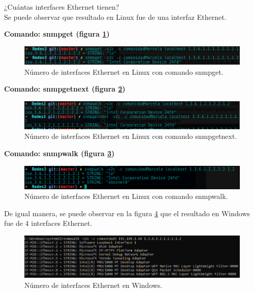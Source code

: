 \item ¿Cuántas interfaces Ethernet tienen?
\\ Se puede observar que resultado en Linux fue de una interfaz Ethernet.

\textbf{Comando: snmpget (figura \ref{image:ethernetget})}
\FloatBarrier
\begin{figure}[htbp!]
		\centering
	\includegraphics[width=.9 \textwidth]{images/ethernetget}
		\caption{Número de interfaces Ethernet en Linux con comando snmpget.}		\label{image:ethernetget}
\end{figure}
\FloatBarrier

\textbf{Comando: snmpgetnext (figura \ref{image:ethernetnext})}
\FloatBarrier
\begin{figure}[htbp!]
		\centering
	\includegraphics[width=.9 \textwidth]{images/ethernetnext}
		\caption{Número de interfaces Ethernet en Linux con comando snmpgetnext.}		\label{image:ethernetnext}
\end{figure}
\FloatBarrier

\textbf{Comando: snmpwalk (figura \ref{image:interfaces})}
\FloatBarrier
\begin{figure}[htbp!]
		\centering
	\includegraphics[width=.9 \textwidth]{images/Pregunta2L}
		\caption{Número de interfaces Ethernet en Linux con comando snmpwalk.}		\label{image:interfaces}
\end{figure}
\FloatBarrier

De igual manera, se puede observar en la figura \ref{image:interfacesw} que el resultado en Windows fue de 4 interfaces Ethernet.
\FloatBarrier
\begin{figure}[htbp!]
		\centering
			\includegraphics[width=.9 \textwidth]{images/windows2}
		\caption{Número de interfaces Ethernet en Windows.}
		\label{image:interfacesw}
\end{figure}
\FloatBarrier

